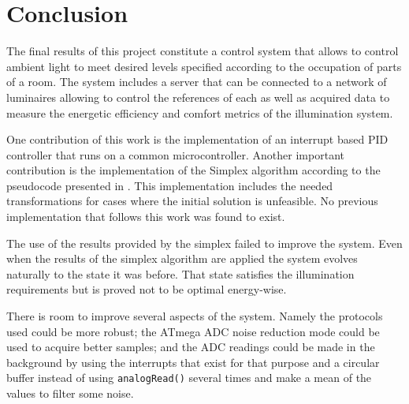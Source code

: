 \section{Conclusion}
\label{conclusion}

The final results of this project constitute a control system that allows to control ambient light to meet desired levels specified according to the occupation of parts of a room. The system includes a server that can be connected to a network of luminaires allowing to control the references of each as well as acquired data to measure the energetic efficiency and comfort metrics of the illumination system.

One contribution of this work is the implementation of an interrupt based PID controller that runs on a common microcontroller. Another important contribution is the implementation of the Simplex algorithm according to the pseudocode presented in \cite{Cormen}. This implementation includes the needed transformations for cases where the initial solution is unfeasible. No previous implementation that follows this work was found to exist.

The use of the results provided by the simplex failed to improve the system. Even when the results of the simplex algorithm are applied the system evolves naturally to the state it was before. That state satisfies the illumination requirements but is proved not to be optimal energy-wise.

There is room to improve several aspects of the system. Namely the protocols used could be more robust; the ATmega ADC noise reduction mode could be used to acquire better samples; and the ADC readings could be made in the background by using the interrupts that exist for that purpose and a circular buffer instead of using \texttt{analogRead()} several times and make a mean of the values to filter some noise.



